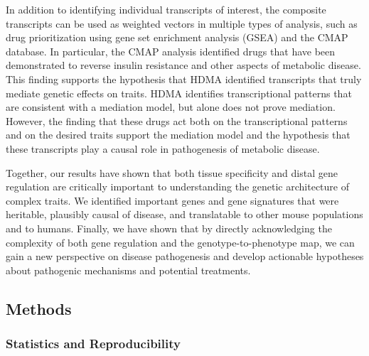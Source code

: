 \documentclass[
]{article}
\begin{document}
In addition to identifying individual transcripts of interest, the
composite transcripts can be used as weighted vectors in multiple types
of analysis, such as drug prioritization using gene set enrichment
analysis (GSEA) and the CMAP database. In particular, the CMAP analysis
identified drugs that have been demonstrated to reverse insulin
resistance and other aspects of metabolic disease. This finding supports
the hypothesis that HDMA identified transcripts that truly mediate
genetic effects on traits. HDMA identifies transcriptional patterns that
are consistent with a mediation model, but alone does not prove
mediation. However, the finding that these drugs act both on the
transcriptional patterns and on the desired traits support the mediation
model and the hypothesis that these transcripts play a causal role in
pathogenesis of metabolic disease.

Together, our results have shown that both tissue specificity and distal
gene regulation are critically important to understanding the genetic
architecture of complex traits. We identified important genes and gene
signatures that were heritable, plausibly causal of disease, and
translatable to other mouse populations and to humans. Finally, we have
shown that by directly acknowledging the complexity of both gene
regulation and the genotype-to-phenotype map, we can gain a new
perspective on disease pathogenesis and develop actionable hypotheses
about pathogenic mechanisms and potential treatments.

\subsection{Methods}\label{methods}

\subsubsection{Statistics and
Reproducibility}\label{statistics-and-reproducibility}
\end{document}
